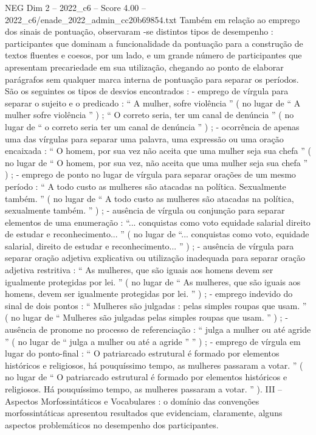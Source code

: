 \begin{textsample}{NEG Dim 2 – 2022\_c6 – Score 4.00 – 2022\_c6/enade\_2022\_admin\_cc20b69854.txt}
Também em relação ao emprego dos sinais de pontuação, observaram -se distintos tipos de desempenho : participantes que dominam a funcionalidade da pontuação para a construção de textos fluentes e coesos, por um lado, e um grande número de participantes que apresentam precariedade em sua utilização, chegando ao ponto de elaborar parágrafos sem qualquer marca interna de pontuação para separar os períodos.
São os seguintes os tipos de desvios encontrados : - emprego de vírgula para separar o sujeito e o predicado : “ A mulher, sofre violência ” ( no lugar de “ A mulher sofre violência ” ) ; “ O correto seria, ter um canal de denúncia ” ( no lugar de “ o correto seria ter um canal de denúncia ” ) ; - ocorrência de apenas uma das vírgulas para separar uma palavra, uma expressão ou uma oração encaixada : “ O homem, por sua vez não aceita que uma mulher seja sua chefa ” ( no lugar de “ O homem, por sua vez, não aceita que uma mulher seja sua chefa ” ) ; - emprego de ponto no lugar de vírgula para separar orações de um mesmo período : “ A todo custo as mulheres são atacadas na política.
Sexualmente também. ” ( no lugar de “ A todo custo as mulheres são atacadas na política, sexualmente também. ” ) ; - ausência de vírgula ou conjunção para separar elementos de uma enumeração : “... conquistas como voto equidade salarial direito de estudar e reconhecimento... ” ( no lugar de “... conquistas como voto, equidade salarial, direito de estudar e reconhecimento... ” ) ; - ausência de vírgula para separar oração adjetiva explicativa ou utilização inadequada para separar oração adjetiva restritiva : “ As mulheres, que são iguais aos homens devem ser igualmente protegidas por lei. ” ( no lugar de “ As mulheres, que são iguais aos homens, devem ser igualmente protegidas por lei. ” ) ; - emprego indevido do sinal de dois pontos : “ Mulheres são julgadas : pelas simples roupas que usam. ” ( no lugar de “ Mulheres são julgadas pelas simples roupas que usam. ” ) ; - ausência de pronome no processo de referenciação : “ julga a mulher ou até agride ” ( no lugar de “ julga a mulher ou até a agride ” ” ) ; - emprego de vírgula em lugar do ponto-final : “ O patriarcado estrutural é formado por elementos históricos e religiosos, há pouquíssimo tempo, as mulheres passaram a votar. ” ( no lugar de “ O patriarcado estrutural é formado por elementos históricos e religiosos.
Há pouquíssimo tempo, as mulheres passaram a votar. ” ).
III – Aspectos Morfossintáticos e Vocabulares : o domínio das convenções morfossintáticas apresentou resultados que evidenciam, claramente, alguns aspectos problemáticos no desempenho dos participantes.

\end{textsample}
